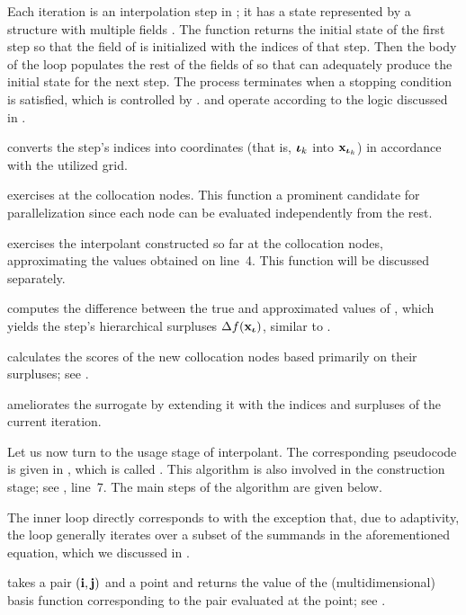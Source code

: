 \begin{compactlist}

 Each iteration is an interpolation step in ;
it has a state represented by a structure with multiple fields . The
 function returns the initial state of the first step so that the
 field of  is initialized with the indices of that step.
Then the body of the loop populates the rest of the fields of  so that
 can adequately produce the initial state for the next step. The
process terminates when a stopping condition is satisfied, which is controlled
by .  and  operate according to the logic
discussed in .

  converts the step's indices into coordinates
(that is, ${\bm{\iota}}_k$ into $\mathbf{x}_{{\bm{\iota}}_k}$) in accordance with the utilized grid.

  exercises  at the collocation
nodes. This function a prominent candidate for parallelization since each node
can be evaluated independently from the rest.

  exercises the interpolant constructed so far at
the collocation nodes, approximating the values obtained on line~4. This
function will be discussed separately.

  computes the difference between the true and
approximated values of , which yields the step's hierarchical
surpluses $\Delta f(\mathbf{x}_{\bm{\iota}})$, similar to .

  calculates the scores of the new collocation
nodes based primarily on their surpluses; see .

  ameliorates the surrogate by extending it with
the indices and surpluses of the current iteration.

\end{compactlist}


Let us now turn to the usage stage of interpolant. The corresponding pseudocode
is given in , which is called . This algorithm is
also involved in the construction stage; see , line~7. The main
steps of the  algorithm are given below.

\begin{compactlist}

 The inner loop directly corresponds to
 with the exception that, due to adaptivity, the loop
generally iterates over a subset of the summands in the aforementioned equation,
which we discussed in .

  takes a pair $(\mathbf{i}, \mathbf{j})$ and a point and
returns the value of the (multidimensional) basis function corresponding to the
pair evaluated at the point; see .

\end{compactlist}

